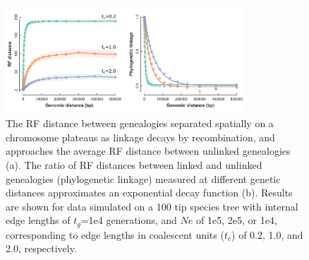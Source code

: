 \documentclass[11pt]{article}
\begin{document}
\begin{figure}
	\centering
		\includegraphics[width=0.8\textwidth]{./figures/Fig-2}
		\caption{
		The RF distance between genealogies separated spatially on a chromosome plateaus as linkage decays by recombination, and  approaches the average RF distance between unlinked genealogies (a). The ratio of RF distances between linked and unlinked genealogies (phylogenetic linkage) measured at different genetic distances approximates an exponential decay function (b). Results are shown for data simulated on a 100 tip species tree with internal edge lengths of $t_g$=1e4 generations, and $Ne$ of 1e5, 2e5, or 1e4, corresponding to edge lengths in coalescent units ($t_c$) of 0.2, 1.0, and 2.0, respectively. 
		}
		\label{fig:2}
\end{figure}


\end{document}
